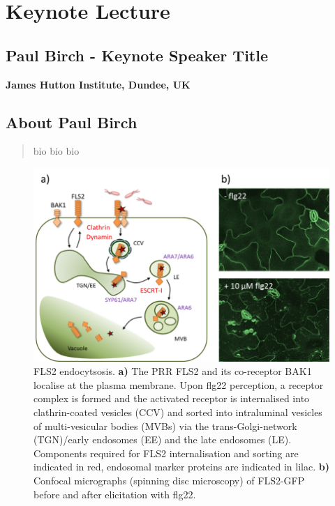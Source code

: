\documentclass[12pt,]{book}
\theoremstyle{definition}
\theoremstyle{definition}
\theoremstyle{remark}
\begin{document}
\section*{Keynote Lecture}\label{keynote-lecture-4}

\subsection*{Paul Birch - Keynote Speaker
Title}\label{paul-birch---keynote-speaker-title}

\textbf{James Hutton Institute, Dundee, UK}

\subsection*{About Paul Birch}\label{about-paul-birch}

\begin{quote}
bio bio bio
\end{quote}












\begin{figure}
\includegraphics[width=4.9in]{assets/sr_fig1_prac} \caption{FLS2 endocytsosis. \textbf{a)} The PRR FLS2 and its
co-receptor BAK1 localise at the plasma membrane. Upon flg22 perception,
a receptor complex is formed and the activated receptor is internalised
into clathrin-coated vesicles (CCV) and sorted into intraluminal
vesicles of multi-vesicular bodies (MVBs) via the trans-Golgi-network
(TGN)/early endosomes (EE) and the late endosomes (LE). Components
required for FLS2 internalisation and sorting are indicated in red,
endosomal marker proteins are indicated in lilac. \textbf{b)} Confocal
micrographs (spinning disc microscopy) of FLS2-GFP before and after
elicitation with flg22.}\label{fig:srfig}
\end{figure}
\end{document}
